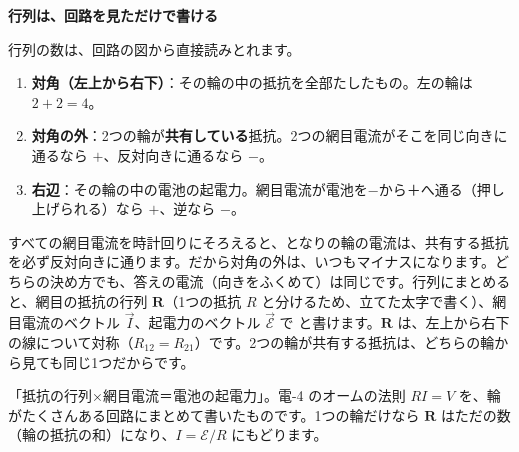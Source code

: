 \noindent\textbf{行列は、回路を見ただけで書ける}\par\nobreak
行列の数は、回路の図から直接読みとれます。
\begin{enumerate}[label={\bkcircled{\arabic*}}, leftmargin=2.4\zw, itemsep=2pt, topsep=2pt]
\item \textbf{対角（左上から右下）}：その輪の中の抵抗を全部たしたもの。左の輪は $2+2=4$。
\item \textbf{対角の外}：2つの輪が\textbf{共有している}抵抗。2つの網目電流がそこを同じ向きに通るなら $+$、反対向きに通るなら $-$。
\item \textbf{右辺}：その輪の中の電池の起電力。網目電流が電池を−から＋へ通る（押し上げられる）なら $+$、逆なら $-$。
\end{enumerate}
すべての網目電流を時計回りにそろえると、となりの輪の電流は、共有する抵抗を必ず反対向きに通ります。だから対角の外は、いつもマイナスになります。どちらの決め方でも、答えの電流（向きをふくめて）は同じです。行列にまとめると、網目の抵抗の行列 $\mathbf R$（1つの抵抗 $R$ と分けるため、立てた太字で書く）、網目電流のベクトル $\vec I$、起電力のベクトル $\vec{\mathcal E}$ で
\label{ph:電-5:mesh}と書けます。$\mathbf R$ は、左上から右下の線について対称（$R_{12}=R_{21}$）です。2つの輪が共有する抵抗は、どちらの輪から見ても同じ1つだからです。

\begin{phyomi}[$\mathbf R\vec I=\vec{\mathcal E}$]
「抵抗の行列×網目電流＝電池の起電力」。電-4 のオームの法則 $RI=V$ を、輪がたくさんある回路にまとめて書いたものです。1つの輪だけなら $\mathbf R$ はただの数（輪の抵抗の和）になり、$I=\mathcal E/R$ にもどります。
\end{phyomi}

\begin{phflow}
\end{phflow}

